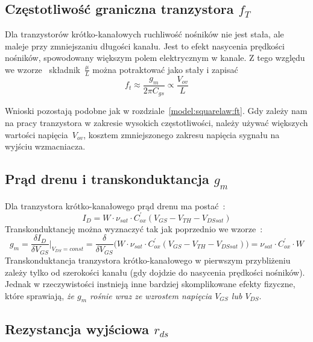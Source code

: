 \documentclass[twoside,pl,final]{labman}
\begin{document}
\subsection{Częstotliwość graniczna tranzystora $f_T$}
\label{model:short:ft}

Dla tranzystorów krótko-kanałowych ruchliwość nośników nie jest stała,
ale maleje przy zmniejszaniu długości kanału.
Jest to efekt nasycenia prędkości nośników,
spowodowany większym polem elektrycznym w kanale.
Z tego względu we wzorze~ składnik~$\frac{\mu}{L}$
można potraktować jako stały i zapisać
\begin{equation}
  f_t \approx \frac{g_m}{2 \pi C_{gs}} \varpropto \frac{V_{ov}}{L}
  \label{eqn:short:ft}
\end{equation}

Wnioski pozostają podobne jak w rozdziale~\ref{model:squarelaw:ft}.
Gdy zależy nam na pracy tranzystora w zakresie wysokich częstotliwości,
należy używać większych wartości napięcia~$V_{ov}$,
kosztem zmniejszonego zakresu napięcia sygnału na wyjściu wzmacniacza.

\subsection{Prąd drenu i transkonduktancja $g_m$}
\label{model:short:id_gm}

Dla tranzystora krótko-kanałowego prąd drenu ma postać~\cite{baker:book}:
\begin{equation}
  I_D = W \cdot \nu_{sat} \cdot C_{ox}^\prime (V_{GS} - V_{TH} - V_{DSsat})
  \label{eqn:short:id}
\end{equation}
Transkonduktancję można wyznaczyć
tak jak poprzednio we wzorze~:
\begin{equation}
  g_m = \frac{\delta I_D}{\delta V_{GS}} \Bigg\vert_{V_{DS} = const}
      = \frac{\delta}{\delta V_{GS}}\big(W \cdot \nu_{sat} \cdot C_{ox}^\prime (V_{GS} - V_{TH} - V_{DSsat})\big)
      = \nu_{sat} \cdot C_{ox}^\prime \cdot W
  \label{eqn:short:gm}
\end{equation}
Transkonduktancja tranzystora krótko-kanałowego
w pierwszym przybliżeniu zależy tylko od szerokości kanału
(gdy dojdzie do nasycenia prędkości nośników).
Jednak w rzeczywistości instnieją inne bardziej skomplikowane efekty fizyczne,
które sprawiają,
\emph{że $g_m$ rośnie wraz ze wzrostem napięcia $V_{GS}$ lub $V_{DS}$}.

\subsection{Rezystancja wyjściowa $r_{ds}$}
\label{model:short:ro}
\end{document}

